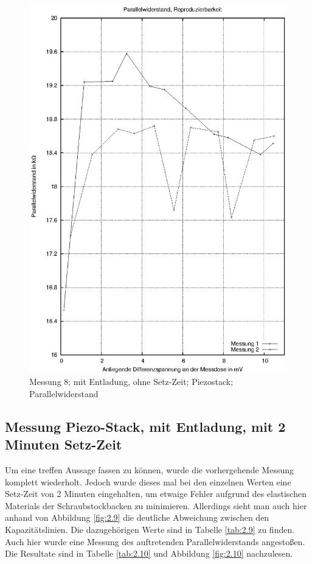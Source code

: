 \documentclass[11pt]{scrreprt} %
\begin{document}
\begin {figure}[htbp]
      \begin{center}
        \includegraphics{tabelle2_2_3}
      \end{center}
\caption{Messung 8; mit Entladung, ohne Setz-Zeit; Piezostack; Parallelwiderstand}
\label{fig:2.8}
\end{figure}

\newpage
\subsection{Messung Piezo-Stack, mit Entladung, mit 2 Minuten Setz-Zeit}
Um eine treffen Aussage fassen zu können, wurde die vorhergehende Messung komplett wiederholt. Jedoch wurde dieses mal bei den einzelnen Werten eine Setz-Zeit von 2 Minuten eingehalten, um etwaige Fehler aufgrund des elastischen Materials der Schraubstockbacken zu minimieren. Allerdings sieht man auch hier anhand von Abbildung \vref{fig:2.9} die deutliche Abweichung zwischen den Kapazitätslinien. Die dazugehörigen Werte sind in Tabelle \vref{tab:2.9} zu finden.\\
Auch hier wurde eine Messung des auftretenden Parallelwiderstands angestoßen. Die Resultate sind in Tabelle \vref{tab:2.10} und Abbildung \vref{fig:2.10} nachzulesen.
\end{document}
